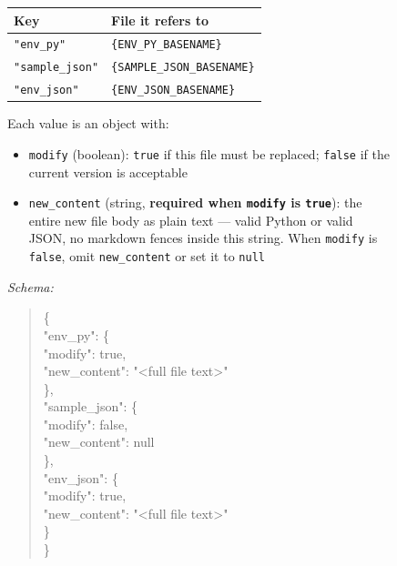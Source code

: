 \begin{figure}[p]
\begin{tcolorbox}[
    enhanced,
    colback=gray!5,
    colframe=black!60,
    arc=2pt,
    boxrule=0.5pt,
    width=\linewidth,
    left=6pt, right=6pt, top=0pt, bottom=16pt,
    parbox=false,
]
\begin{minipage}[t]{0.477\linewidth}
\vspace{2pt}
\begin{tabular}{@{}p{2.0cm}p{5.0cm}@{}}
\toprule
\textbf{Key} & \textbf{File it refers to} \\
\midrule
\texttt{"env\_py"}      & \texttt{\{ENV\_PY\_BASENAME\}} \\[2pt]
\texttt{"sample\_json"} & \texttt{\{SAMPLE\_JSON\_BASENAME\}} \\[2pt]
\texttt{"env\_json"}    & \texttt{\{ENV\_JSON\_BASENAME\}} \\
\bottomrule
\end{tabular}

\vspace{3pt}
Each value is an object with:
\begin{itemize}[nosep,leftmargin=1em,topsep=1pt,itemsep=0pt]
  \item \texttt{modify} (boolean): \texttt{true} if this file must be replaced; \texttt{false} if the current version is acceptable
  \item \texttt{new\_content} (string, \textbf{required when \texttt{modify} is \texttt{true}}): the entire new file body as plain text — valid Python or valid JSON, no markdown fences inside this string. When \texttt{modify} is \texttt{false}, omit \texttt{new\_content} or set it to \texttt{null}
\end{itemize}

\vspace{2pt}
\textit{Schema:}
\begin{quote}\ttfamily\scriptsize\vspace{-2pt}
\{\\
\phantom{x}"env\_py": \{\\
\phantom{xx}"modify": true,\\
\phantom{xx}"new\_content": "<full file text>"\\
\phantom{x}\},\\
\phantom{x}"sample\_json": \{\\
\phantom{xx}"modify": false,\\
\phantom{xx}"new\_content": null\\
\phantom{x}\},\\
\phantom{x}"env\_json": \{\\
\phantom{xx}"modify": true,\\
\phantom{xx}"new\_content": "<full file text>"\\
\phantom{x}\}\\
\}
\end{quote}


\end{minipage}
\end{tcolorbox}
\end{figure}
